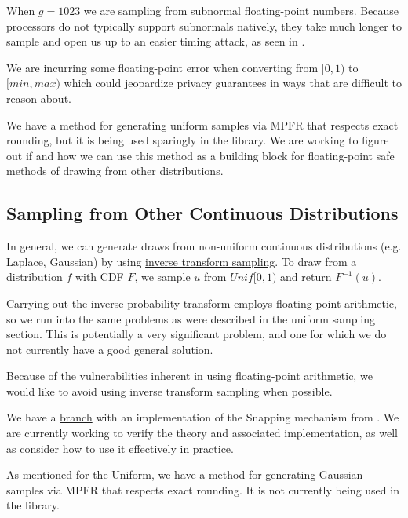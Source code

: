 \documentclass[11pt]{scrartcl} %
\begin{document}
\begin{tcolorbox}[colback = {green}, title = {Known Privacy Issues}, colbacktitle = black]
	When $g=1023$ we are sampling from subnormal floating-point numbers. Because processors do not typically support
	subnormals natively, they take much longer to sample and open us up to an easier timing attack, as
	seen in \cite{AKM+15}. \newline

	We are incurring some floating-point error when converting from $[0,1)$ to $[min, max)$ which
	could jeopardize privacy guarantees in ways that are difficult to reason about.\cite{Mir12} \cite{Ilv19}
\end{tcolorbox}

We have a method for generating uniform samples via MPFR that respects exact rounding, but it is being used sparingly in the library.
We are working to figure out if and how we can use this method as a building block for floating-point safe methods of drawing from 
other distributions.


\subsection{Sampling from Other Continuous Distributions}
In general, we can generate draws from non-uniform continuous distributions (e.g. Laplace, Gaussian)
by using \href{https://en.wikipedia.org/wiki/Inverse_transform_sampling}{inverse transform sampling}.
To draw from a distribution $f$ with CDF $F$,
we sample $u$ from $Unif[0,1)$ and return $F^{-1}(u)$. \newline

\begin{tcolorbox}[colback = {green}, title = {Known Privacy Issues}, colbacktitle = black]
	Carrying out the inverse probability transform employs floating-point arithmetic,
	so we run into the same problems as were described in the uniform sampling section.
	This is potentially a very significant problem, and one for which we do not
	currently have a good general solution.
\end{tcolorbox}
Because of the vulnerabilities inherent in using floating-point arithmetic, we would
like to avoid using inverse transform sampling when possible. \newline 

We have a \href{https://github.com/opendifferentialprivacy/whitenoise-core/tree/CC_add_snapping}{branch} with an implementation of 
the Snapping mechanism from \cite{Mir12}. We are currently working to verify the theory and associated implementation, as well 
as consider how to use it effectively in practice. \newline 

As mentioned for the Uniform, we have a method for generating Gaussian samples via MPFR that respects exact rounding. It is not 
currently being used in the library.




\end{document}
